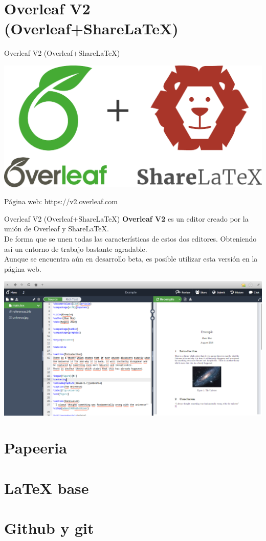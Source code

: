 \documentclass[12pt,aspectratio=43]{beamer}
\begin{document}
\section{Overleaf V2 (Overleaf+ShareLaTeX)}
\begin{frame}{Overleaf V2 (Overleaf+ShareLaTeX)}{}
\begin{center}
	\includegraphics[width=0.7\linewidth]{Overleaf+ShareLaTeX_Logo}
\end{center}

Página web: https://v2.overleaf.com
\end{frame}

\begin{frame}{Overleaf V2 (Overleaf+ShareLaTeX)}{}
\alert{\bf Overleaf V2} es un editor creado por la unión de Overleaf y ShareLaTeX.\pause\\[1em]

De forma que se unen todas las características de estos dos editores. Obteniendo así un entorno de trabajo bastante agradable.\pause\\[1em]

Aunque se encuentra aún en desarrollo beta, es posible utilizar esta versión en la página web.
\end{frame}

\begin{frame}[plain]{}{}
\includegraphics[width=\linewidth]{OverleafV2_Screen}
\end{frame}

\section{Papeeria}

\section{LaTeX base}

\section{Github y git}
\end{document}
